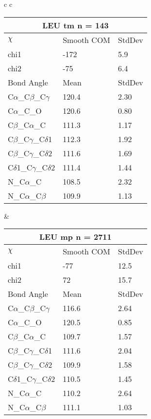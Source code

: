 \begin{longtable}{ c c }
  \begin{tabular}{ l l l }
  \toprule
  \multicolumn{3}{c}{LEU \textbf{tm} n = 143} \\ \toprule
  $\chi$       & Smooth COM & StdDev \\ \midrule
  chi1 & -172 & 5.9 \\ 
  chi2 & -75 & 6.4 \\ \midrule
  Bond Angle   & Mean     & StdDev \\ \midrule
  C$\alpha$\_C$\beta$\_C$\gamma$ & 120.4 & 2.30\\
  C$\alpha$\_C\_O & 120.6 & 0.80\\
  C$\beta$\_C$\alpha$\_C & 111.3 & 1.17\\
  C$\beta$\_C$\gamma$\_C$\delta$1 & 112.3 & 1.92\\
  C$\beta$\_C$\gamma$\_C$\delta$2 & 111.6 & 1.69\\
  C$\delta$1\_C$\gamma$\_C$\delta$2 & 111.4 & 1.44\\
  N\_C$\alpha$\_C & 108.5 & 2.32\\
  N\_C$\alpha$\_C$\beta$ & 109.9 & 1.13\\
  \bottomrule
  \end{tabular}
  &
  \begin{tabular}{ l l l }
  \toprule
  \multicolumn{3}{c}{LEU \textbf{mp} n = 2711} \\ \toprule
  $\chi$       & Smooth COM & StdDev \\ \midrule
  chi1 & -77 & 12.5 \\ 
  chi2 & 72 & 15.7 \\ \midrule
  Bond Angle   & Mean     & StdDev \\ \midrule
  C$\alpha$\_C$\beta$\_C$\gamma$ & 116.6 & 2.64\\
  C$\alpha$\_C\_O & 120.5 & 0.85\\
  C$\beta$\_C$\alpha$\_C & 109.7 & 1.57\\
  C$\beta$\_C$\gamma$\_C$\delta$1 & 111.6 & 2.04\\
  C$\beta$\_C$\gamma$\_C$\delta$2 & 109.9 & 1.58\\
  C$\delta$1\_C$\gamma$\_C$\delta$2 & 110.5 & 1.45\\
  N\_C$\alpha$\_C & 110.2 & 2.64\\
  N\_C$\alpha$\_C$\beta$ & 111.1 & 1.03\\
  \bottomrule
  \end{tabular}
  \\
  \begin{tabular}{ l l l }
  \toprule

\end{tabular}
\end{longtable}
